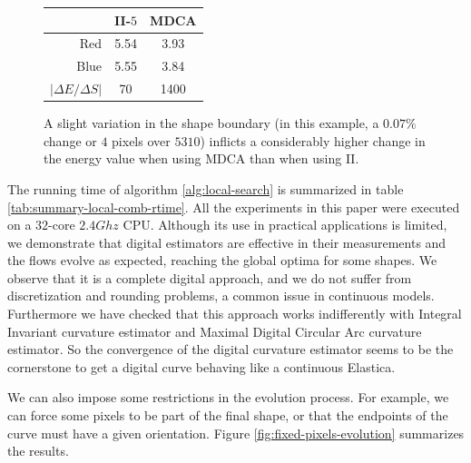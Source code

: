 \begin{figure}[h!]
\begin{minipage}[b]{0.4\textwidth}
\captionsetup{type=table}
\begin{tabular}{r|c|c}
& II-$5$ & MDCA \\
\hline
Red  & 5.54 & 3.93\\
Blue & 5.55 & 3.84\\
\hline
$| \Delta E / \Delta S |$ & 70 & 1400
\end{tabular}
\end{minipage}
\caption{A slight variation in the shape boundary (in this example, a $0.07\%$ change or $4$ pixels over $5310$) inflicts a considerably higher change in the energy value when using MDCA than when using II. }
\label{fig:mdca-sensitivity}
\end{figure}





The running time of algorithm \ref{alg:local-search} is summarized in table \ref{tab:summary-local-comb-rtime}. All the experiments in this paper were executed on a $32$-core $2.4Ghz$ CPU. Although its use in practical applications is
limited, we demonstrate that digital estimators are effective in their measurements and the flows evolve as expected, reaching the global optima for some shapes. We
observe that it is a complete digital approach, and we do not suffer from discretization and rounding problems, a common
issue in continuous models.  Furthermore we have checked that this approach works indifferently with Integral Invariant
curvature estimator and Maximal Digital Circular Arc curvature estimator. So the convergence of the digital curvature
estimator seems to be the cornerstone to get a digital curve behaving like a continuous Elastica.  

We can also impose some restrictions in the evolution process. For example, we can force some pixels to be part of the final shape, or that the endpoints of the curve must have a given orientation. Figure \ref{fig:fixed-pixels-evolution} summarizes the results.

